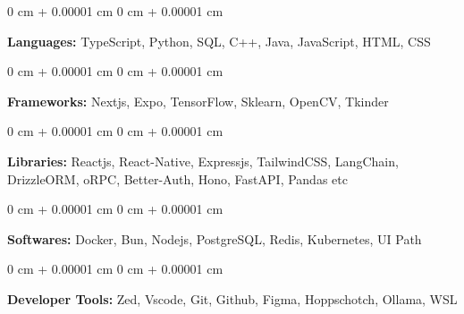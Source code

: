 \documentclass[10pt, letterpaper]{article}
\newenvironment{onecolentry}{
    \begin{adjustwidth}{
        0 cm + 0.00001 cm
    }{
        0 cm + 0.00001 cm
    }
}{
    \end{adjustwidth}
} %
\begin{document}
\begin{onecolentry}
	\textbf{Languages:} TypeScript, Python, SQL, C++, Java, JavaScript, HTML, CSS
\end{onecolentry}

\vspace{0.2 cm}

\begin{onecolentry}
	\textbf{Frameworks:} Nextjs, Expo, TensorFlow, Sklearn, OpenCV, Tkinder
\end{onecolentry}
\vspace{0.2 cm}

\begin{onecolentry}
	\textbf{Libraries:} Reactjs, React-Native, Expressjs, TailwindCSS, LangChain, DrizzleORM, oRPC, Better-Auth, Hono, FastAPI, Pandas etc
\end{onecolentry}
\vspace{0.2 cm}

\begin{onecolentry}
	\textbf{Softwares:} Docker, Bun, Nodejs, PostgreSQL, Redis, Kubernetes, UI Path %
\end{onecolentry}
\vspace{0.2 cm}

\begin{onecolentry}
	\textbf{Developer Tools:} Zed, Vscode, Git, Github, Figma, Hoppschotch, Ollama, WSL
\end{onecolentry}
\end{document}
